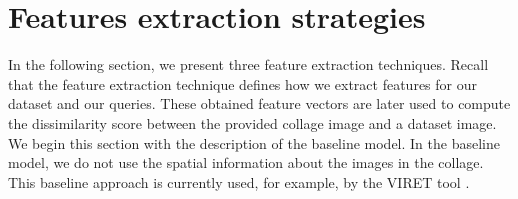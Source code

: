 




\section{Features extraction strategies}

In the following section, we present three feature extraction techniques. Recall that the feature extraction technique defines how we extract features for our dataset and our queries. These obtained feature vectors are later used to compute the dissimilarity score between the provided collage image and a dataset image. We begin this section with the description of the baseline model. In the baseline model, we do not use the spatial information about the images in the collage. This baseline approach is currently used, for example, by the VIRET tool \citep{kovalvcik2020viret}. 

